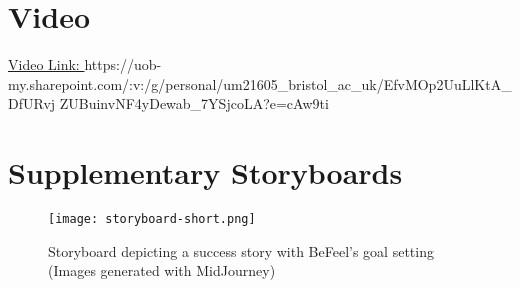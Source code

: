 \documentclass[acmsmall, screen, nonacm, 9pt, a4paper,top=2cm,bottom=2cm,left=1cm,right=1cm, marginparwidth=1cm]{acmart}
\begin{document}
\section{Video}
\href{https://uob-my.sharepoint.com/:v:/g/personal/um21605_bristol_ac_uk/EfvMOp2UuLlKtA_DfURvjZUBuinvNF4yDewab_7YSjcoLA?e=cAw9ti}{Video Link: }
https://uob-my.sharepoint.com/:v:/g/personal/um21605\_bristol\_ac\_uk/EfvMOp2UuLlKtA\_DfURvj
ZUBuinvNF4yDewab\_7YSjcoLA?e=cAw9ti




\appendix
\section{Supplementary Storyboards}
\begin{figure}[H]
    \centering
    \texttt{[image: storyboard-short.png]}
    \caption{Storyboard depicting a success story with BeFeel's goal setting (Images generated with MidJourney)}
    \label{fig:storyboard-short}
\end{figure}

\end{document}
